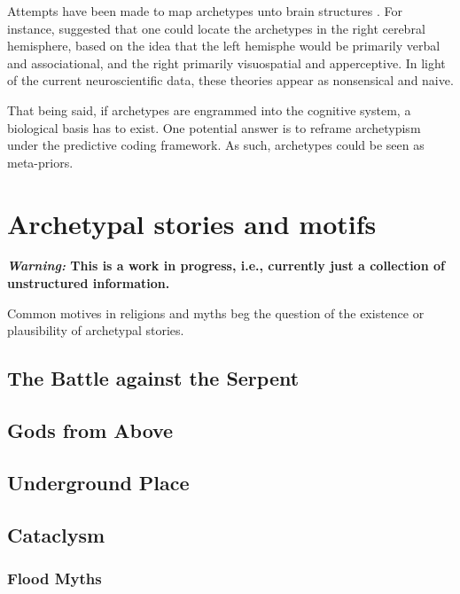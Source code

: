 \documentclass[
]{book}
\begin{document}
Attempts have been made to map archetypes unto brain structures \citep{samuels2003jung}. For instance, \citet{rossi1977cerebral} suggested that one could locate the archetypes in the right cerebral hemisphere, based on the idea that the left hemisphe would be primarily verbal and associational, and the right primarily visuospatial and apperceptive. In light of the current neuroscientific data, these theories appear as nonsensical and naive.

That being said, if archetypes are engrammed into the cognitive system, a biological basis has to exist. One potential answer is to reframe archetypism under the predictive coding framework. As such, archetypes could be seen as meta-priors.

\hypertarget{archetypal-stories-and-motifs}{%
\chapter{Archetypal stories and motifs}\label{archetypal-stories-and-motifs}}

\textbf{\emph{Warning:} This is a work in progress, i.e., currently just a collection of unstructured information.}

Common motives in religions and myths beg the question of the existence or plausibility of archetypal stories.

\hypertarget{the-battle-against-the-serpent}{%
\section{The Battle against the Serpent}\label{the-battle-against-the-serpent}}

\hypertarget{gods-from-above}{%
\section{Gods from Above}\label{gods-from-above}}

\hypertarget{underground-place}{%
\section{Underground Place}\label{underground-place}}

\hypertarget{cataclysm}{%
\section{Cataclysm}\label{cataclysm}}

\hypertarget{flood-myths}{%
\subsection{Flood Myths}\label{flood-myths}}
\end{document}
